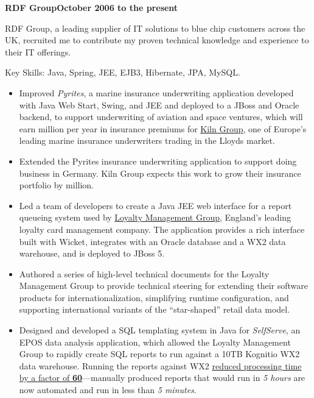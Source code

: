 \documentclass[a4paper,12pt]{article}
\newcommand{\head}[1]{\begin{center}{\large{\textbf{\sc{#1}}}}\nopagebreak\end{center}}
\newcommand{\jobheld}[2]{\textbf{#1\hfill #2}\nopagebreak}
\newcommand{\keyskills}[1]{\vspace{10pt}Key Skills: #1.}
\begin{document}
\head{Professional Experience}

\jobheld{RDF Group}{October 2006 to the present}

RDF Group, a leading supplier of IT solutions to blue chip customers across the UK, recruited me to contribute my proven technical knowledge and experience to their IT offerings.

\keyskills{Java, Spring, JEE, EJB3, Hibernate, JPA, MySQL}

\begin{itemize}

\item Improved \emph{Pyrites}, a marine insurance underwriting application developed with Java Web Start, Swing, and JEE and deployed to a JBoss and Oracle backend, to support underwriting of aviation and space ventures, which will earn  million per year in insurance premiums for \href{http://www.kilngroup.com/}{Kiln Group}, one of Europe's leading marine insurance underwriters trading in the Lloyds market.

\item Extended the Pyrites insurance underwriting application to support doing business in Germany.  Kiln Group expects this work to grow their insurance portfolio by  million.

\item Led a team of developers to create a Java JEE web interface for a report queueing system used by \href{http://www.loyalty.co.uk/}{Loyalty Management Group}, England's leading loyalty card management company.  The application provides a rich interface built with Wicket, integrates with an Oracle database and a WX2 data warehouse, and is deployed to JBoss 5.

\item Authored a series of high-level technical documents for the Loyalty Management Group to provide technical steering for extending their software products for internationalization, simplifying runtime configuration, and supporting international variants of the ``star-shaped'' retail data model.

\item Designed and developed a SQL templating system in Java for \emph{SelfServe}, an EPOS data analysis application, which allowed the Loyalty Management Group to rapidly create SQL reports to run against a 10TB Kognitio WX2 data warehouse.  Running the reports against WX2 \href{http://www.kognitio.com/casestudies/casestudy_lmg.php}{reduced processing time by a factor of \textbf{60}}---manually produced reports that would run in \emph{5 hours} are now automated and run in less than \emph{5 minutes}.


\end{itemize}
\end{document}
